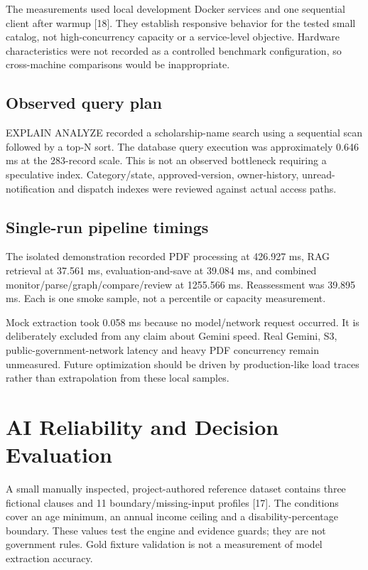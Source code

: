 \documentclass[12pt,a4paper,twoside]{report}
\begin{document}
The measurements used local development Docker services and one sequential client after warmup [18]. They establish responsive behavior for the tested small catalog, not high-concurrency capacity or a service-level objective. Hardware characteristics were not recorded as a controlled benchmark configuration, so cross-machine comparisons would be inappropriate.

\subsection*{Observed query plan}

EXPLAIN ANALYZE recorded a scholarship-name search using a sequential scan followed by a top-N sort. The database query execution was approximately 0.646 ms at the 283-record scale. This is not an observed bottleneck requiring a speculative index. Category/state, approved-version, owner-history, unread-notification and dispatch indexes were reviewed against actual access paths.

\subsection*{Single-run pipeline timings}

The isolated demonstration recorded PDF processing at 426.927 ms, RAG retrieval at 37.561 ms, evaluation-and-save at 39.084 ms, and combined monitor/parse/graph/compare/review at 1255.566 ms. Reassessment was 39.895 ms. Each is one smoke sample, not a percentile or capacity measurement.

Mock extraction took 0.058 ms because no model/network request occurred. It is deliberately excluded from any claim about Gemini speed. Real Gemini, S3, public-government-network latency and heavy PDF concurrency remain unmeasured. Future optimization should be driven by production-like load traces rather than extrapolation from these local samples.

\section{AI Reliability and Decision Evaluation}

A small manually inspected, project-authored reference dataset contains three fictional clauses and 11 boundary/missing-input profiles [17]. The conditions cover an age minimum, an annual income ceiling and a disability-percentage boundary. These values test the engine and evidence guards; they are not government rules. Gold fixture validation is not a measurement of model extraction accuracy.
\end{document}
